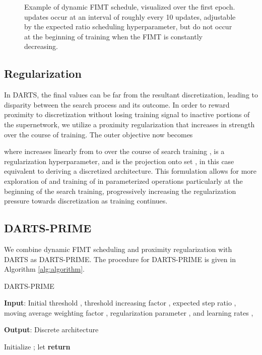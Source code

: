 \documentclass[letterpaper]{article} \usepackage{aaai22}  \usepackage{times}  \usepackage{helvet}  \usepackage{courier}  \usepackage[hyphens]{url}  \usepackage{graphicx} \urlstyle{rm} \def\UrlFont{\rm}  \usepackage{natbib}  \usepackage{caption} \DeclareCaptionStyle{ruled}{labelfont=normalfont,labelsep=colon,strut=off} \frenchspacing  \setlength{\pdfpagewidth}{8.5in}  \setlength{\pdfpageheight}{11in}  \usepackage{algorithm}
\begin{document}
\begin{figure}[ht!]
\caption{Example of dynamic FIMT schedule, visualized over the first epoch.  updates occur at an interval of roughly every 10  updates, adjustable by the expected ratio scheduling hyperparameter, but do not occur at the beginning of training when the FIMT is constantly decreasing.}
\label{fig:fimt}
\end{figure}

\subsection{Regularization}
In DARTS, the final  values can be far from the resultant discretization, leading to disparity between the search process and its outcome. In order to reward proximity to discretization without losing training signal to inactive portions of the supernetwork, we utilize a proximity regularization that increases in strength over the course of training. The outer objective now becomes

where  increases linearly from  to  over the course of search training ,  is a regularization hyperparameter, and  is the projection onto set , in this case equivalent to deriving a discretized architecture. This formulation allows for more exploration of  and training of  in parameterized operations particularly at the beginning of the search training, progressively increasing the regularization pressure towards discretization as training continues.

\subsection{DARTS-PRIME}
We combine dynamic FIMT scheduling and proximity regularization with DARTS as DARTS-PRIME. The procedure for DARTS-PRIME is given in Algorithm \ref{alg:algorithm}.

\begin{algorithm}[tb]
\caption{DARTS-PRIME}
\label{alg:algorithm}
 \small
\textbf{Input}: Initial threshold , threshold increasing factor , expected step ratio , moving average weighting factor , regularization parameter , and learning rates ,  

\textbf{Output}: Discrete architecture  

\begin{algorithmic}[1] 
\STATE Initialize ; let  
\STATE 
\STATE  \STATE 
\IF {}
\STATE 
\STATE 
\ELSE
\STATE 
\ENDIF
\STATE 
\ENDWHILE
\STATE \textbf{return} 
\end{algorithmic}
\end{algorithm}
\end{document}
